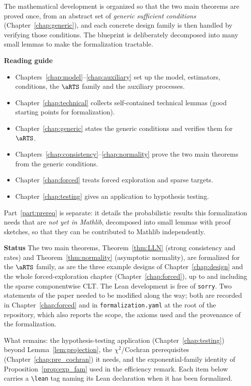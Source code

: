 The mathematical development is organized so that the two main theorems are
proved once, from an abstract set of \emph{generic sufficient conditions}
(Chapter~\ref{chap:generic}), and each concrete design family is then handled by
verifying those conditions. The blueprint is deliberately decomposed into many
small lemmas to make the formalization tractable.

\textbf{Reading guide}
\begin{itemize}
  \item Chapters~\ref{chap:model}--\ref{chap:auxiliary} set up the model,
        estimators, conditions, the $\aRTS$ family and the auxiliary processes.
  \item Chapter~\ref{chap:technical} collects self-contained technical lemmas
        (good starting points for formalization).
  \item Chapter~\ref{chap:generic} states the generic conditions and verifies
        them for $\aRTS$.
  \item Chapters~\ref{chap:consistency}--\ref{chap:normality} prove the two main
        theorems from the generic conditions.
  \item Chapter~\ref{chap:forced} treats forced exploration and sparse targets.
  \item Chapter~\ref{chap:testing} gives an application to hypothesis testing.
\end{itemize}

Part~\ref{part:prereq} is separate: it details the probabilistic results this
formalization needs that are \emph{not yet in Mathlib}, decomposed into small
lemmas with proof sketches, so that they can be contributed to Mathlib
independently.

\textbf{Status} The two main theorems, Theorem~\ref{thm:LLN} (strong consistency and rates) and
Theorem~\ref{thm:normality} (asymptotic normality), are formalized for the $\aRTS$ family, as are
the three example designs of Chapter~\ref{chap:design} and the whole forced-exploration chapter
(Chapter~\ref{chap:forced}), up to and including the sparse componentwise CLT. The Lean development
is free of \texttt{sorry}. Two statements of the paper needed to be modified along the way; both are
recorded in Chapter~\ref{chap:forced} and in \texttt{formalization.yaml} at the root of the
repository, which also reports the scope, the axioms used and the provenance of the formalization.

What remains: the hypothesis-testing application (Chapter~\ref{chap:testing}) beyond
Lemma~\ref{lem:projection}, the $\chi^2$/Cochran prerequisites (Chapter~\ref{chap:pre_cochran}) it
needs, and the exponential-family identity of Proposition~\ref{prop:exp_fam} used in the efficiency
remark. Each item below carries a \texttt{\textbackslash lean} tag naming its Lean declaration when
it has been formalized.

